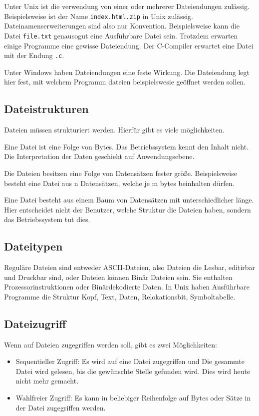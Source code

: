 Unter Unix ist die verwendung von einer oder mehrerer Dateiendungen zulässig. Beispielsweise ist der Name \texttt{index.html.zip} in Unix zulässig. Datei\-namens\-er\-weiterungen sind also nur Konvention. Beispielsweise kann die Datei \texttt{file.txt} genausogut eine Ausführbare Datei sein. Trotzdem erwarten einige Programme eine gewisse Dateiendung. Der C-Compiler erwartet eine Datei mit der Endung \texttt{.c}.

Unter Windows haben Dateiendungen eine feste Wirkung. Die Dateiendung legt hier fest, mit welchem Programm dateien beispielswesie geöffnet werden sollen.

\subsection{Dateistrukturen}

Dateien müssen strukturiert werden. Hierfür gibt es viele möglichkeiten.

Eine Datei ist eine Folge von Bytes. Das Betriebssystem kennt den Inhalt nicht. Die Interpretation der Daten geschieht auf Anwendungsebene.

Die Dateien besitzen eine Folge von Datensätzen fester größe. Beispielsweise besteht eine Datei aus n Datensätzen, welche je m bytes beinhalten dürfen.

Eine Datei besteht aus einem Baum von Datensätzen mit unterschiedlicher länge. Hier entscheidet nicht der Benutzer, welche Struktur die Dateien haben, sondern das Betriebssystem tut dies.

\subsection{Dateitypen}

Reguläre Dateien sind entweder ASCII-Dateien, also Dateien die Lesbar, editirbar und Druckbar sind, oder Dateien können Binär Dateien sein. Sie enthalten Prozessorinstruktionen oder Binärdekodierte Daten. In Unix haben Ausführbare Programme die Struktur Kopf, Text, Daten, Relokationsbit, Symboltabelle. 

\subsection{Dateizugriff}

Wenn auf Dateien zugegriffen werden soll, gibt es zwei Möglichkeiten:

\begin{itemize}
    \item Sequentieller Zugriff: Es wird auf eine Datei zugegriffen und Die gesammte Datei wird gelesen, bis die gewünschte Stelle gefunden wird. Dies wird heute nicht mehr gemacht.
    \item Wahlfreier Zugriff: Es kann in beliebiger Reihenfolge auf Bytes oder Sätze in der Datei zugegriffen werden.
\end{itemize}

